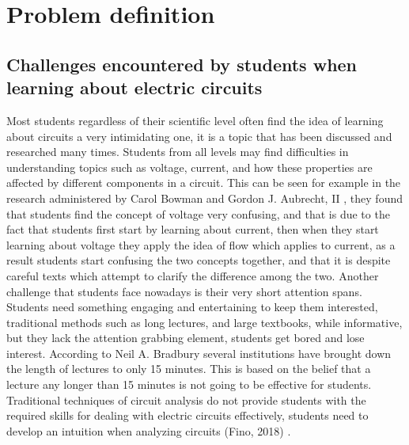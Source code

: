 \documentclass[../main.tex]{subfiles}
\begin{document}
\section{Problem definition}
\subsection{Challenges encountered by students when learning about electric circuits}
Most students regardless of their scientific level often find the idea of learning about circuits a very intimidating one, it is a topic that has been discussed and researched many times. Students from all levels may find difficulties in understanding topics such as voltage, current, and how these properties are affected by different components in a circuit. This can be seen for example in the research administered by Carol Bowman and Gordon J. Aubrecht, II \cite{1}, they found that students find the concept of voltage very confusing, and that is due to the fact that students first start by learning about current, then when they start learning about voltage they apply the idea of flow which applies to current, as a result students start confusing the two concepts together, and that it is despite careful texts which attempt to clarify the difference among the two.
Another challenge that students face nowadays is their very short attention spans. Students need something engaging and entertaining to keep them interested, traditional methods such as long lectures, and large textbooks, while informative, but they lack the attention grabbing element, students get bored and lose interest. According to Neil A. Bradbury \cite{17} several institutions have brought down the length of lectures to only 15 minutes. This is based on the belief that a lecture any longer than 15 minutes is not going to be effective for students.
Traditional techniques of circuit analysis do not provide students with the required skills for dealing with electric circuits effectively, students need to develop an intuition when analyzing circuits (Fino, 2018) \cite{18}.
\end{document}
